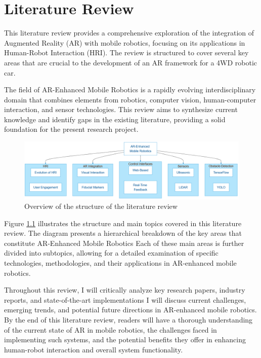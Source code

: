 \chapter{\label{ch:lit_review} Literature Review}

This literature review provides a comprehensive exploration of the integration of Augmented Reality (AR) with mobile robotics, focusing on its applications in Human-Robot Interaction (HRI). The review is structured to cover several key areas that are crucial to the development of an AR framework for a 4WD robotic car. 

The field of AR-Enhanced Mobile Robotics is a rapidly evolving interdisciplinary domain that combines elements from robotics, computer vision, human-computer interaction, and sensor technologies. This review aims to synthesize current knowledge and identify gaps in the existing literature, providing a solid foundation for the present research project.

\begin{figure}[ht]
    \centering
    \includegraphics[width=1\textwidth]{ch2/figs/lit_overview.png}
    \caption{Overview of the structure of the literature review }
    \label{fig:Lit_overview}
\end{figure}

Figure \ref{fig:Lit_overview} illustrates the structure and main topics covered in this literature review. The diagram presents a hierarchical breakdown of the key areas that constitute AR-Enhanced Mobile Robotics Each of these main areas is further divided into subtopics, allowing for a detailed examination of specific technologies, methodologies, and their applications in AR-enhanced mobile robotics.

Throughout this review, I will critically analyze key research papers, industry reports, and state-of-the-art implementations I will discuss current challenges, emerging trends, and potential future directions in AR-enhanced mobile robotics. By the end of this literature review, readers will have a thorough understanding of the current state of AR in mobile robotics, the challenges faced in implementing such systems, and the potential benefits they offer in enhancing human-robot interaction and overall system functionality.

